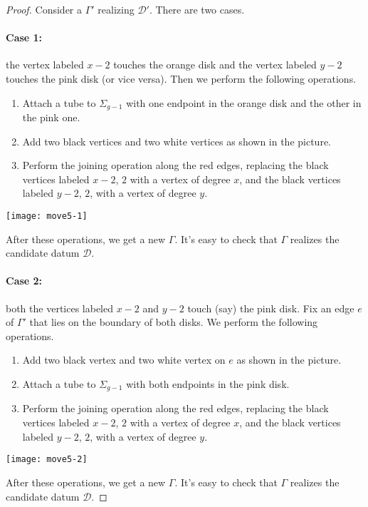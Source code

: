 \documentclass{article}
\begin{document}
\begin{proof}
Consider a \dessin{} $\Gamma'$ realizing $\mathcal{D}'$. There are two cases.
\paragraph{Case 1:} the vertex labeled $x-2$ touches the orange disk and the vertex labeled $y-2$ touches the pink disk (or vice versa). Then we perform the following operations.
\begin{enumerate}
\item Attach a tube to $\Sigma_{g-1}$ with one endpoint in the orange disk and the other in the pink one.
\item Add two black vertices and two white vertices as shown in the picture.
\item Perform the joining operation along the red edges, replacing the black vertices labeled $x-2$, $2$ with a vertex of degree $x$, and the black vertices labeled $y-2$, $2$, with a vertex of degree $y$.
\end{enumerate}
\begin{center}
\texttt{[image: move5-1]}
\end{center}
After these operations, we get a new \dessin{} $\Gamma$. It's easy to check that $\Gamma$ realizes the candidate datum $\mathcal{D}$.
\paragraph{Case 2:} both the vertices labeled $x-2$ and $y-2$ touch (say) the pink disk. Fix an edge $e$ of $\Gamma'$ that lies on the boundary of both disks. We perform the following operations.
\begin{enumerate}
\item Add two black vertex and two white vertex on $e$ as shown in the picture.
\item Attach a tube to $\Sigma_{g-1}$ with both endpoints in the pink disk.
\item Perform the joining operation along the red edges, replacing the black vertices labeled $x-2$, $2$ with a vertex of degree $x$, and the black vertices labeled $y-2$, $2$, with a vertex of degree $y$.
\end{enumerate}
\begin{center}
\texttt{[image: move5-2]}
\end{center}
After these operations, we get a new \dessin{} $\Gamma$. It's easy to check that $\Gamma$ realizes the candidate datum $\mathcal{D}$.
\end{proof}
\end{document}
